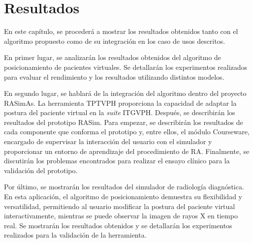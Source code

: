 \chapter{Resultados} 
\label{cap:results}

En este capítulo, se procederá a mostrar los resultados obtenidos tanto con el algoritmo propuesto como de su integración en los caso de usos descritos. 
%

En primer lugar, se analizarán los resultados obtenidos del algoritmo de posicionamiento de pacientes virtuales. Se detallarán los experimentos realizados para evaluar el rendimiento y los resultados utilizando distintos modelos.

En segundo lugar, se hablará de la integración del algoritmo dentro del proyecto \ac{RASimAs}. La herramienta \ac{TPTVPH} proporciona la capacidad de adaptar la postura del paciente virtual en la \emph{suite} \ac{ITGVPH}. %
Después, se describirán los resultados del prototipo \ac{RASim}. Para empezar, se describirán los resultados de cada componente que conforma el prototipo y, entre ellos, el módulo \acs{Courseware}, encargado de supervisar la interacción del usuario con el simulador y proporcionar un entorno de aprendizaje del procedimiento de \ac{RA}. Finalmente, se discutirán los problemas encontrados para realizar el ensayo clínico para la validación del prototipo. %

Por último, se mostrarán los resultados del simulador de radiología diagnóstica. En esta aplicación, el algoritmo de posicionamiento demuestra su flexibilidad y versatilidad, permitiendo al usuario modificar la postura del paciente virtual interactivamente, mientras se puede observar la imagen de rayos X en tiempo real. Se mostrarán los resultados obtenidos y se detallarán los experimentos realizados para la validación de la herramienta. %


